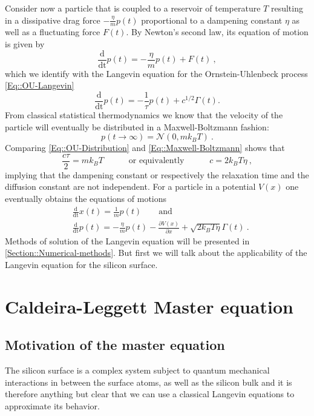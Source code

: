 	Consider now a particle that is coupled to a reservoir of temperature $T$ resulting in a dissipative drag force $- \frac{\eta}{m} p(t)$ proportional to a dampening constant $\eta$ as well as a fluctuating force $F(t)$. By Newton's second law, its equation of motion is given by
	\begin{equation}
		\frac{\text{d}}{\text{dt}} p(t) =	- \frac{\eta}{m} p(t) + F(t)~,
	\end{equation}
	which we identify with the Langevin equation for the Ornstein-Uhlenbeck process \autoref{Eq::OU-Langevin}
	\begin{equation}
		\frac{\text{d}}{\text{dt}} p(t) =	- \frac{1}{\tau} p(t) + { c^{1/2}}{} \Gamma(t).
	\end{equation}
	From classical statistical thermodynamics we know that the velocity of the particle will eventually be distributed in a Maxwell-Boltzmann fashion:
	\begin{equation} \label{Eq::Maxwell-Boltzmann}
		p(t\rightarrow \infty) =	\mathcal{N}(0, m k_B T)~.
	\end{equation}
	Comparing \autoref{Eq::OU-Distribution} and \autoref{Eq::Maxwell-Boltzmann} shows that
	\begin{equation}
		\frac{c \tau}{2} =	m k_B T \qquad \quad \text{or equivalently} \qquad \quad c =	{2 k_B T \eta }~, 			
	\end{equation}
	implying that the dampening constant or respectively the relaxation time and the diffusion constant are not independent. For a particle in a potential $V(x)$ one eventually obtains the equations of motions
	\begin{align} \label{Eq::Langevin-eq-motion-set-x}
		&\frac{\text{d}}{\text{dt}} x(t) =	\frac{1}{m} p(t) \qquad \text{and}\\
		\label{Eq::Langevin-eq-motion-set-p}
		&\frac{\text{d}}{\text{dt}} p(t) =	- \frac{\eta}{m} p(t) - \frac{\partial V(x)}{\partial x} + \sqrt{2 k_B T \eta } \Gamma(t) ~.
	\end{align} 	
	Methods of solution of the Langevin equation will be presented in \autoref{Section::Numerical-methods}. But first we will talk about the applicability of the Langevin equation for the silicon surface.
	\section{Caldeira-Leggett Master equation}
	\subsection{Motivation of the master equation}
	The silicon surface is a complex system subject to quantum mechanical interactions in between the surface atoms, as well as the silicon bulk and it is therefore anything but clear that we can use a classical Langevin equations to approximate its behavior.\\
	
